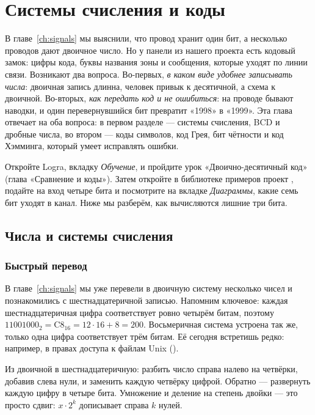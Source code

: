 \chapter{Системы счисления и коды}
\label{ch:codes}

В главе~\ref{ch:signals} мы выяснили, что провод хранит один бит, а несколько
проводов дают двоичное число. Но у панели из нашего проекта есть кодовый
замок: цифры кода, буквы названия зоны и сообщения, которые уходят по линии
связи. Возникают два вопроса. Во-первых, \emph{в каком виде удобнее записывать
числа}: двоичная запись длинна, человек привык к десятичной, а схема
к двоичной. Во-вторых, \emph{как передать код и не ошибиться}: на проводе
бывают наводки, и один перевернувшийся бит превратит «1998» в «1999».
Эта глава отвечает на оба вопроса: в первом разделе --- системы счисления,
BCD и дробные числа, во втором --- коды символов, код Грея, бит чётности и
код Хэмминга, который умеет исправлять ошибки.

\begin{buildbox}
Откройте Logra, вкладку \emph{Обучение}, и пройдите урок «Двоично-десятичный
код» (глава «Сравнение и коды»). Затем откройте в библиотеке примеров
проект , подайте на вход четыре бита и посмотрите на
вкладке \emph{Диаграммы}, какие семь бит уходят в канал. Ниже мы разберём,
как вычисляются лишние три бита.
\end{buildbox}

\section{Числа и системы счисления}

\subsection{Быстрый перевод}

В главе~\ref{ch:signals} мы уже перевели в двоичную систему несколько чисел
и познакомились с шестнадцатеричной записью. Напомним ключевое: каждая
шестнадцатеричная цифра соответствует ровно четырём битам, поэтому
$11001000_2 = \text{C8}_{16} = 12\cdot 16 + 8 = 200$. Восьмеричная система
устроена так же, только одна цифра соответствует трём битам. Её сегодня
встретишь редко: например, в правах доступа к файлам Unix ().

\begin{infobox}
Из двоичной в шестнадцатеричную: разбить число справа налево на четвёрки,
добавив слева нули, и заменить каждую четвёрку цифрой. Обратно --- развернуть
каждую цифру в четыре бита. Умножение и деление на степень двойки --- это
просто сдвиг: $x \cdot 2^k$ дописывает справа $k$ нулей.
\end{infobox}


